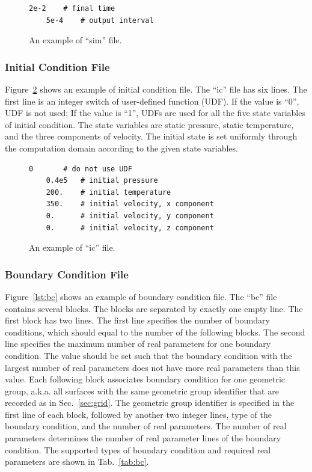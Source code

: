 \documentclass[]{article}
\begin{document}
\begin{figure}[h!]
  \begin{lstlisting}[backgroundcolor=\color{lightgray}]
    2e-2	# final time
    5e-4	# output interval
  \end{lstlisting}
  \caption{An example of ``sim'' file.}
  \label{lst:sim}
\end{figure}

\subsubsection{Initial Condition File}

Figure~\ref{lst:ic} shows an example of initial condition file.
The ``ic'' file has six lines.
The first line is an integer switch of user-defined function (UDF).
If the value is ``0'', UDF is not used;
If the value is ``1'', UDFs are used for all the five state variables of initial condition.
The state variables are static pressure, static temperature, and the three components of velocity.
The initial state is set uniformly through the computation domain according to the given state
variables.

\begin{figure}[h!]
  \begin{lstlisting}[backgroundcolor=\color{lightgray}]
    0		# do not use UDF
    0.4e5	# initial pressure
    200.	# initial temperature
    350.	# initial velocity, x component
    0.		# initial velocity, y component
    0.		# initial velocity, z component
  \end{lstlisting}
  \caption{An example of ``ic'' file.}
  \label{lst:ic}
\end{figure}

\subsubsection{Boundary Condition File}

Figure~\ref{lst:bc} shows an example of boundary condition file.
The ``bc'' file contains several blocks.
The blocks are separated by exactly one empty line.
The first block has two lines.
The first line specifies the number of boundary conditions, which should equal to the number of the
following blocks.
The second line specifies the maximum number of real parameters for one boundary condition.
The value should be set such that the boundary condition with the largest number of real parameters
does not have more real parameters than this value.
Each following block associates boundary condition for one geometric group, a.k.a. all surfaces with
the same geometric group identifier that are recorded as in Sec.~\ref{sec:grid}.
The geometric group identifier is specified in the first line of each block, followed by another two
integer lines, type of the boundary condition, and the number of real parameters.
The number of real parameters determines the number of real parameter lines of the boundary
condition.
The supported types of boundary condition and required real parameters are shown in
Tab.~\ref{tab:bc}.
\end{document}
